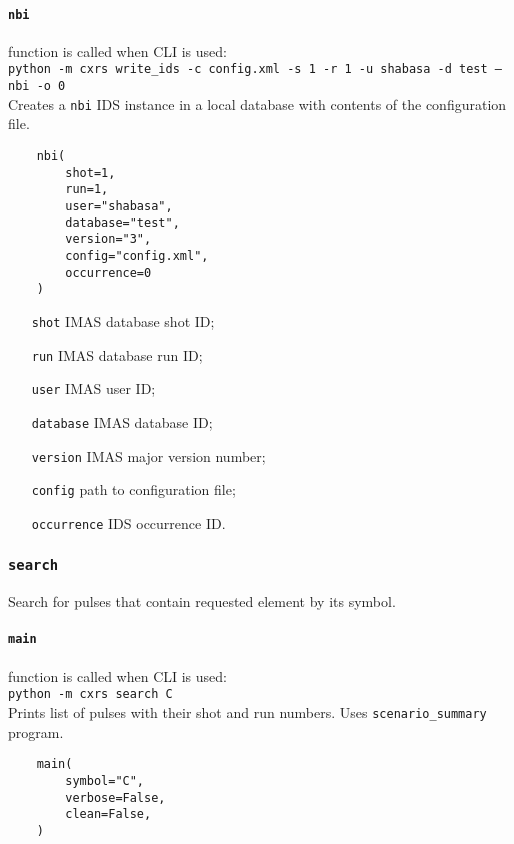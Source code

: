 \documentclass[../../main]{subfiles}
\begin{document}
\paragraph{\texttt{nbi}} function is called when CLI is used:\\
\texttt{python -m cxrs write_ids -c config.xml -s 1 -r 1 -u shabasa -d test --nbi -o 0}\\
Creates a \texttt{nbi} IDS instance in a local database with contents of the configuration file.

\begin{verbatim}
    nbi(
        shot=1,
        run=1,
        user="shabasa",
        database="test",
        version="3",
        config="config.xml",
        occurrence=0
    )
\end{verbatim}

\begin{itemize}[align=left]
    \item[\texttt{shot}] IMAS database shot ID;
    \item[\texttt{run}] IMAS database run ID;
    \item[\texttt{user}] IMAS user ID;
    \item[\texttt{database}] IMAS database ID;
    \item[\texttt{version}] IMAS major version number;
    \item[\texttt{config}] path to configuration file;
    \item[\texttt{occurrence}] IDS occurrence ID.
\end{itemize}
\subsubsection{\texttt{search}}

Search for pulses that contain requested element by its symbol.

\paragraph{\texttt{main}} function is called when CLI is used:\\
\texttt{python -m cxrs search C}\\
Prints list of pulses with their shot and run numbers. Uses \texttt{scenario_summary} program.

\begin{verbatim}
    main(
        symbol="C",
        verbose=False,
        clean=False,
    )
\end{verbatim}
\end{document}
